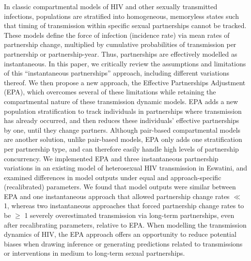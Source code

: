 In classic compartmental models of HIV and other sexually transmitted infections, %
populations are stratified into homogeneous, memoryless states
such that timing of transmission within specific sexual partnerships cannot be tracked.
These models define the force of infection (incidence rate) via
mean rates of partnership change, multiplied by
cumulative probabilities of transmission per partnership or partnership-year.
Thus, partnerships are effectively modelled as instantaneous.
In this paper, we critically review %
the assumptions and limitations of this ``instantaneous partnerships'' approach,
including different variations thereof.
We then propose a new approach, the Effective Partnerships Adjustment (EPA),
which overcomes several of these limitations while retaining the compartmental nature of these transmission dynamic models. %
EPA adds a new population stratification to track
individuals in partnerships where transmission has already occurred,
and then reduces these individuals' effective partnerships by one,
until they change partners. %
Although pair-based compartmental models are another solution, unlike pair-based models, %
 EPA only adds one stratification per partnership type,
and can therefore easily handle high levels of partnership concurrency. %
We implemented EPA and three instantaneous partnership variations
in an existing model of heterosexual HIV transmission in Eswatini,
and examined differences in model outputs
under equal and approach-specific (recalibrated) parameters.
We found that model outputs were similar between EPA and
one instantaneous approach that allowed partnership change rates $\ll$ 1, whereas
two instantaneous approaches that forced partnership change rates to be $\ge$ 1
severely overestimated transmission via long-term partnerships,
even after recalibrating parameters, relative to EPA.
When modelling the transmission dynamics of HIV, the EPA approach offers an opportunity to reduce potential biases when 
drawing inference or generating predictions related to transmissions or interventions in medium to long-term sexual partnerships.

